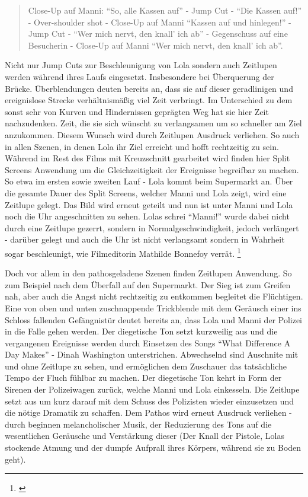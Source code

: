 \begin{quote}
Close-Up auf Manni: "`So, alle Kassen auf"' - Jump Cut - "`Die Kassen auf!"' - Over-shoulder shot - Close-Up auf Manni "`Kassen auf und hinlegen!"' - Jump Cut - "`Wer mich nervt, den knall' ich ab"' - Gegenschuss auf eine Besucherin - Close-Up auf Manni "`Wer mich nervt, den knall' ich ab"'.
\end{quote}

Nicht nur Jump Cuts zur Beschleunigung von Lola sondern auch Zeitlupen werden während ihres Laufs eingesetzt. Insbesondere bei Überquerung der Brücke. Überblendungen deuten bereits an, dass sie auf dieser geradlinigen und ereignislose Strecke verhältnismäßig viel Zeit verbringt. Im Unterschied zu dem sonst sehr von Kurven und Hindernissen geprägten Weg hat sie hier Zeit nachzudenken. Zeit, die sie sich wünscht zu verlangsamen um so schneller am Ziel anzukommen. Diesem Wunsch wird durch Zeitlupen Ausdruck verliehen. So auch in allen Szenen, in denen Lola ihr Ziel erreicht und hofft rechtzeitig zu sein. Während im Rest des Films mit Kreuzschnitt gearbeitet wird finden hier Split Screens Anwendung um die Gleichzeitigkeit der Ereignisse begreifbar zu machen. So etwa im ersten sowie zweiten Lauf - Lola kommt beim Supermarkt an. Über die gesamte Dauer des Split Screens, welcher Manni und Lola zeigt, wird eine Zeitlupe gelegt. Das Bild wird erneut geteilt und nun ist unter Manni und Lola noch die Uhr angeschnitten zu sehen. Lolas schrei "`Manni!"' wurde dabei nicht durch eine Zeitlupe gezerrt, sondern in Normalgeschwindigkeit, jedoch verlängert - darüber gelegt und auch die Uhr ist nicht verlangsamt sondern in Wahrheit sogar beschleunigt, wie Filmeditorin Mathilde Bonnefoy verrät.  \footnote{\cite[S. 5]{DIEDRINGLICHKEITDERLIEBE}} 

Doch vor allem in den pathosgeladene Szenen finden Zeitlupen Anwendung. So zum Beispiel nach dem Überfall auf den Supermarkt. Der Sieg ist zum Greifen nah, aber auch die Angst nicht rechtzeitig zu entkommen begleitet die Flüchtigen. Eine von oben und unten zuschnappende Trickblende mit dem Geräusch einer ins Schloss fallenden Gefängnistür deutet bereits an, dass Lola und Manni der Polizei in die Falle gehen werden.  Der diegetische Ton setzt kurzweilig aus und die vergangenen Ereignisse werden durch Einsetzen des Songs "`What Difference A Day Makes"' - Dinah Washington unterstrichen. Abwechselnd sind Auschnite mit und ohne Zeitlupe zu sehen, und ermöglichen dem Zuschauer das tatsächliche Tempo der Fluch fühlbar zu machen. Der diegetische Ton kehrt in Form der Sirenen  der Polizeiwagen zurück, welche Manni und Lola einkesseln. Die Zeitlupe setzt aus um kurz darauf mit dem Schuss des Polizisten wieder einzusetzen und die nötige Dramatik zu schaffen. Dem Pathos wird erneut Ausdruck verliehen - durch beginnen melancholischer Musik, der Reduzierung des Tons auf die wesentlichen Geräusche und Verstärkung dieser (Der Knall der Pistole, Lolas stockende Atmung und der dumpfe Aufprall ihres Körpers, während sie zu Boden geht). 

